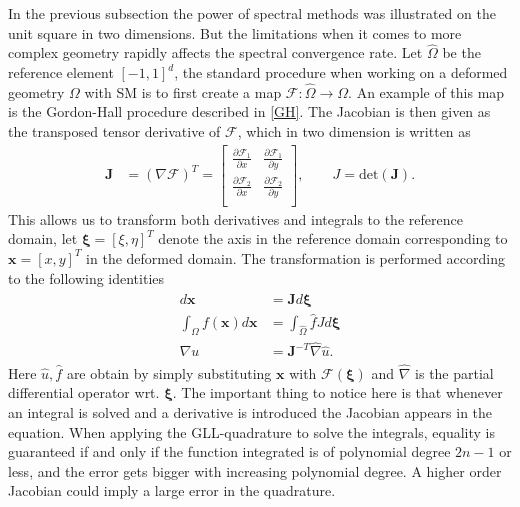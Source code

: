 In the previous subsection the power of spectral methods was illustrated on the unit square in two dimensions.
But the limitations when it comes to more complex geometry rapidly affects the spectral convergence rate. 
Let $\hat{\Omega}$ be the reference element $[-1,1]^d$,
the standard procedure when working on a deformed geometry $\Omega$ with SM is to first create a map 
$\mathcal{F}:\hat{\Omega}\rightarrow\Omega$. An example of this map is the Gordon-Hall procedure 
described in \cref{GH}.
The Jacobian is then given as the transposed tensor derivative of $\mathcal{F}$, which in two dimension is 
written as 
\begin{align}
    \mathbf{J} &= (\nabla \mathcal{F})^T =
\begin{bmatrix}
    \frac{\partial \mathcal{F}_1}{\partial x} &  \frac{\partial \mathcal{F}_1}{\partial y}  \\ 	
	\frac{\partial \mathcal{F}_2}{\partial x} &  \frac{\partial \mathcal{F}_2}{\partial y} \\ 	
\end{bmatrix},\qquad
J = \text{det}(\mathbf{J}).
    \label{eq:jaobian}
\end{align}
This allows us to transform both derivatives and integrals to the reference domain, let $\boldsymbol\xi = [\xi,\eta]^T$ denote the axis in the reference 
domain corresponding to $\mathbf{x} = [x,y]^T$ in the deformed domain. The transformation is performed according to the following identities
\begin{align}
    \begin{split}
        d\mathbf{x} &= \mathbf{J}d\boldsymbol\xi \\
        \int_{\Omega}f(\mathbf{x})d\mathbf{x} &= \int_{\hat\Omega}\hat f J d\boldsymbol\xi \\
        \nabla u &= \mathbf{J}^{-T}\hat\nabla \hat u.
    \end{split}
    \label{eq:transforms}
\end{align}
Here $\hat u,\hat f$ are obtain by simply substituting $\mathbf{x}$ with $\mathcal{F}(\boldsymbol{\xi})$ and $\hat \nabla $ is the partial 
differential operator wrt. $\boldsymbol\xi$. The important thing to notice here is that whenever an integral is solved and a derivative is 
introduced the Jacobian appears in the equation. When applying the GLL-quadrature to solve the integrals, equality is guaranteed if and 
only if the function integrated is of polynomial degree $2n-1$ or less, 
and the error gets bigger with increasing polynomial degree. A higher order Jacobian could imply a large error in the quadrature.

